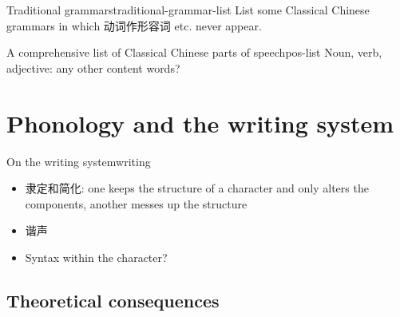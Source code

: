 \documentclass[UTF8, a4paper, oneside, scheme=plain, 12pt]{ctexrep}
\begin{document}
\begin{todobox}{Traditional grammars}{traditional-grammar-list}
    List some Classical Chinese grammars in which 动词作形容词 etc. never appear.
\end{todobox}

\begin{todobox}{A comprehensive list of Classical Chinese parts of speech}{pos-list}
    Noun, verb, adjective: any other content words?
\end{todobox}

\chapter{Phonology and the writing system}

\begin{todobox}{On the writing system}{writing}
    \begin{itemize}
        \item 隶定和简化: one keeps the structure of a character and only alters the components, another messes up the structure
        \item 谐声
        \item Syntax within the character?
    \end{itemize}
\end{todobox}

\section{Theoretical consequences}\label{sec:writing-system.theoretical}
\end{document}
